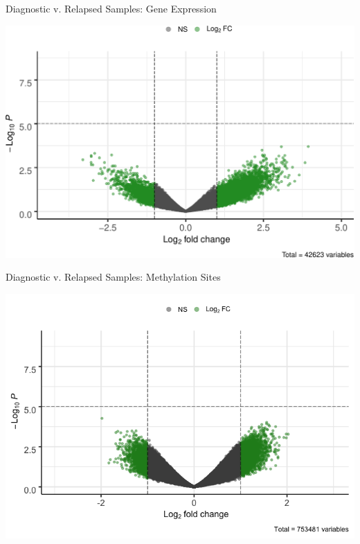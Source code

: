 \documentclass[ignorenonframetext,]{beamer}
\begin{document}
\begin{frame}{Diagnostic v. Relapsed Samples: Gene Expression}
\protect\hypertarget{diagnostic-v.-relapsed-samples-gene-expression}{}

\includegraphics[height=0.85\textheight]{final_presentation_slides_files/figure-beamer/DRR_gene_volcano-1}

\end{frame}

\begin{frame}{Diagnostic v. Relapsed Samples: Methylation Sites}
\protect\hypertarget{diagnostic-v.-relapsed-samples-methylation-sites}{}

\includegraphics[height=0.85\textheight]{final_presentation_slides_files/figure-beamer/DRR_methyl_volcano-1}

\end{frame}
\end{document}
